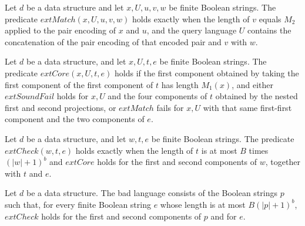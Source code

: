 \begin{definition}
\label{Complexity.Yap.Data.Match}
\leanok
{}
Let $d$ be a data structure and let $x,U,u,v,w$ be finite Boolean strings. The predicate
$	ext{Match}(x,U,u,v,w)$ holds exactly when the length of $v$ equals $M_2$ applied to
the pair encoding of $x$ and $u$, and the query language $U$ contains the concatenation
of the pair encoding of that encoded pair and $v$ with $w$.
\end{definition}

\begin{definition}
\label{Complexity.Yap.Data.Core}
\leanok
{}
Let $d$ be a data structure, and let $x,U,t,e$ be finite Boolean strings. The predicate
$	ext{Core}(x,U,t,e)$ holds if the first component obtained by taking the first
component of the first component of $t$ has length $M_1(x)$, and either
$	ext{SoundFail}$ holds for $x,U$ and the four components of $t$ obtained by the nested
first and second projections, or $	ext{Match}$ fails for $x,U$ with that same
first-first component and the two components of $e$.
\end{definition}

\begin{definition}
\label{Complexity.Yap.Data.Check}
\leanok
{}
Let $d$ be a data structure, and let $w,t,e$ be finite Boolean strings. The predicate
$	ext{Check}(w,t,e)$ holds exactly when the length of $t$ is at most $B$ times
$(|w|+1)^b$ and $	ext{Core}$ holds for the first and second components of $w$, together
with $t$ and $e$.
\end{definition}

\begin{definition}
\label{Complexity.Yap.Data.badLang}
\leanok
{}
Let $d$ be a data structure. The bad language consists of the Boolean strings $p$ such
that, for every finite Boolean string $e$ whose length is at most $B(|p|+1)^b$,
$	ext{Check}$ holds for the first and second components of $p$ and for $e$.
\end{definition}

